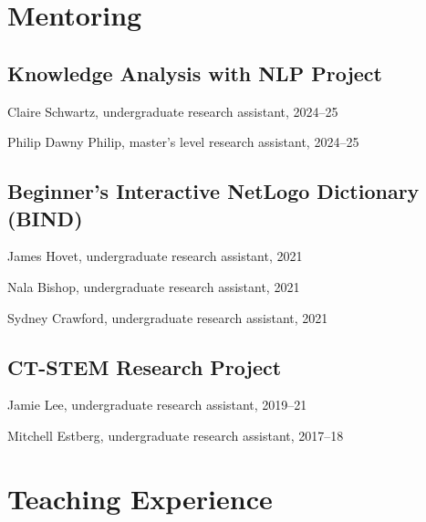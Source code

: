 \documentclass[11pt,letterpaper]{report} %
\newcommand{\listitemspace}{0.25em}
\renewenvironment{itemize}
{\begin{list}{}{\setlength{\leftmargin}{0em}
                \setlength{\parskip}{0em}
                \setlength{\itemsep}{\listitemspace}
                \setlength{\parsep}{\listitemspace}}}
{\end{list}}
\begin{document}


    \section*{Mentoring}

    \subsection*{Knowledge Analysis with NLP Project}

    \begin{itemize}
        \item Claire Schwartz, undergraduate research assistant, 2024--25
        \item Philip Dawny Philip, master's level research assistant, 2024--25
    \end{itemize}

    \subsection*{Beginner's Interactive NetLogo Dictionary (BIND)}

    \begin{itemize}
        \item James Hovet, undergraduate research assistant, 2021
        \item Nala Bishop, undergraduate research assistant, 2021
        \item Sydney Crawford, undergraduate research assistant, 2021
    \end{itemize}

    \subsection*{CT-STEM Research Project}

    \begin{itemize}
        \item Jamie Lee, undergraduate research assistant, 2019--21
        \item Mitchell Estberg, undergraduate research assistant, 2017--18
    \end{itemize}




    \section*{Teaching Experience}
\end{document}
